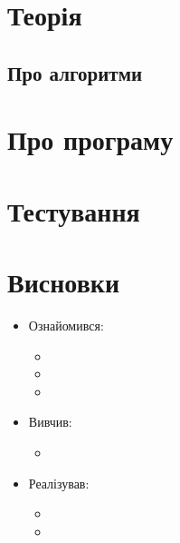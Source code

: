 \section{Теорія}
\subsection{Про алгоритми}

\section{Про програму}

\section{Тестування}

\section{Висновки}
\begin{itemize}
	\item Ознайомився:
		\begin{itemize}
			\item
			\item
			\item
		\end{itemize}
	\item Вивчив:
		\begin{itemize}
			\item
		\end{itemize}
	\item Реалізував:
		\begin{itemize}
			\item
			\item 
		\end{itemize}
\end{itemize}